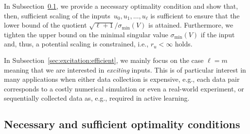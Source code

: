 \documentclass[a4paper, reqno]{amsart}
\newcommand{\dd}{\ell}
\begin{document}
In Subsection~\ref{sec:excitation:optimality}, we provide a necessary optimality condition and show that, then, sufficient scaling of the inputs~$u_0,u_1,\ldots,u_{\dd}$ is sufficient to ensure that the lower bound of the quotient $\sqrt{\dd+1} / \sigma_{\operatorname{min}}(V)$ is attained. 
Furthermore, we tighten the upper bound on the minimal singular value $\sigma_{\operatorname{min}}(V)$ if the input and, thus, a potential scaling is constrained, i.e., $r_u < \infty$ holds.

In Subsection~\ref{sec:excitation:efficient}, we mainly focus on the case $\dd = m$ meaning that we are interested in \textit{exciting} inputs. This is of particular interest in many applications when either data collection is expensive, e.g., each data pair corresponds to a costly numerical simulation or even a real-world experiment, or sequentially collected data as, e.g., required in active learning.



\subsection{Necessary and sufficient optimality conditions}
\label{sec:excitation:optimality}
\end{document}
